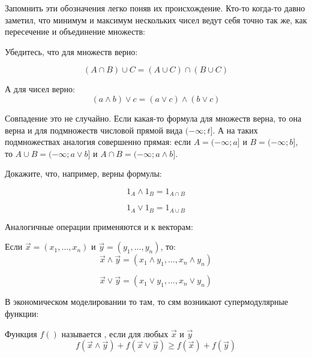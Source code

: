 Запомнить эти обозначения легко поняв их происхождение. Кто-то когда-то давно заметил, что минимум и максимум нескольких чисел ведут себя точно так же, как пересечение и объединение множеств:

Убедитесь, что для множеств верно:

\begin{equation}
(A \cap B)\cup C=(A\cup C)\cap (B\cup C)
\end{equation}

А для чисел верно:
\begin{equation}
(a \wedge b)\vee c=(a\vee c)\wedge (b\vee c)
\end{equation}

Совпадение это не случайно. Если какая-то формула для множеств верна, то она верна и для подмножеств числовой прямой вида $ (-\infty;t] $. А на таких подмножествах аналогия совершенно прямая: если $ A=(-\infty;a] $ и $ B=(-\infty;b] $, то $ A\cup B= (-\infty;a\vee b] $ и $ A\cap B=(-\infty;a\wedge b] $.

Докажите, что, например, верны формулы:

\begin{equation}
1_{A}\wedge 1_{B}=1_{A\cap B}
\end{equation}

\begin{equation}
1_{A}\vee 1_{B}=1_{A\cup B}
\end{equation}



Аналогичные операции применяются и к векторам:

\begin{mydef} Если $ \vec{x}=(x_{1},\ldots, x_{n}) $ и $ \vec{y}=(y_{1},\ldots, y_{n}) $, то:
\begin{equation}
\vec{x}\wedge\vec{y}=(x_{1}\wedge y_{1}, \ldots, x_{n}\wedge y_{n})
\end{equation}

\begin{equation}
\vec{x}\vee\vec{y}=(x_{1}\vee y_{1}, \ldots, x_{n}\vee y_{n})
\end{equation}

\end{mydef}


В экономическом моделировании то там, то сям возникают супермодулярные функции:

\begin{mydef} Функция $ f() $ называется , если для любых $ \vec{x} $ и $ \vec{y} $
\begin{equation}
f(\vec{x}\wedge\vec{y})+f(\vec{x}\vee\vec{y})\geq f(\vec{x})+f(\vec{y})
\end{equation}

\end{mydef}

